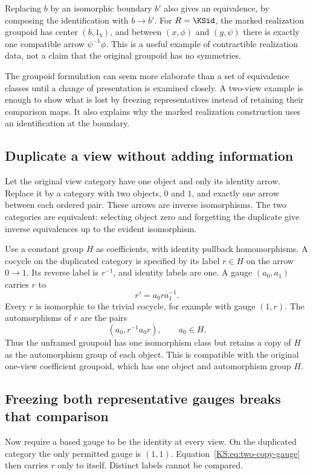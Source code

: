 Replacing \(b\) by an isomorphic boundary \(b'\) also gives an equivalence, by composing the identification with \(b\to b'\). For \(R=\KSid\), the marked realization groupoid has center \((b,1_b)\), and between \((x,\phi)\) and \((y,\psi)\) there is exactly one compatible arrow \(\psi^{-1}\phi\). This is a useful example of contractible realization data, not a claim that the original groupoid has no symmetries.




\label{KS:sec:boundary-lab}
The groupoid formulation can seem more elaborate than a set of equivalence classes until a change of presentation is examined closely. A two-view example is enough to show what is lost by freezing representatives instead of retaining their comparison maps. It also explains why the marked realization construction uses an identification at the boundary.

\subsection{Duplicate a view without adding information}
Let the original view category have one object and only its identity arrow. Replace it by a category with two objects, \(0\) and \(1\), and exactly one arrow between each ordered pair. These arrows are inverse isomorphisms. The two categories are equivalent: selecting object zero and forgetting the duplicate give inverse equivalences up to the evident isomorphism.

Use a constant group \(H\) as coefficients, with identity pullback homomorphisms. A cocycle on the duplicated category is specified by its label \(r\in H\) on the arrow \(0\to1\). Its reverse label is \(r^{-1}\), and identity labels are one. A gauge \((a_0,a_1)\) carries \(r\) to
\begin{equation}\label{KS:eq:two-copy-gauge}
 r'=a_0ra_1^{-1}.
\end{equation}
Every \(r\) is isomorphic to the trivial cocycle, for example with gauge \((1,r)\). The automorphisms of \(r\) are the pairs
\[
 (a_0,r^{-1}a_0r),\qquad a_0\in H.
\]
Thus the unframed groupoid has one isomorphism class but retains a copy of \(H\) as the automorphism group of each object. This is compatible with the original one-view coefficient groupoid, which has one object and automorphism group \(H\).

\subsection{Freezing both representative gauges breaks that comparison}
Now require a based gauge to be the identity at every view. On the duplicated category the only permitted gauge is \((1,1)\). Equation~\eqref{KS:eq:two-copy-gauge} then carries \(r\) only to itself. Distinct labels cannot be compared.

